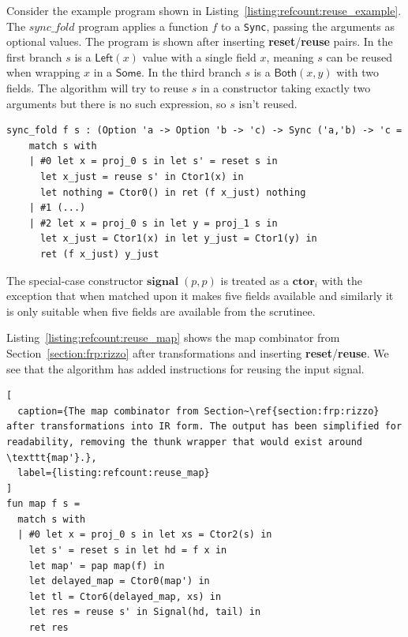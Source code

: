 Consider the example program shown in Listing~\ref{listing:refcount:reuse_example}. The $sync\_fold$ program applies a function $f$ to a \texttt{Sync}, passing the arguments as optional values. 
The program is shown after inserting \textbf{reset}/\textbf{reuse} pairs.
In the first branch $s$ is a $\mathsf{Left}(x)$ value with a single field $x$, meaning $s$ can be reused when wrapping $x$ in a $\mathsf{Some}$. 
In the third branch $s$ is a $\mathsf{Both}(x,y)$ with two fields. The algorithm will try to reuse $s$ in a constructor taking exactly two arguments but there is no such expression, so $s$ isn't reused.

\begin{lstlisting}[caption={A fold on sync values. The program is shown using the IR but with a type annotation for readability.}, label={listing:refcount:reuse_example}]
sync_fold f s : (Option 'a -> Option 'b -> 'c) -> Sync ('a,'b) -> 'c = 
    match s with
    | #0 let x = proj_0 s in let s' = reset s in
      let x_just = reuse s' in Ctor1(x) in 
      let nothing = Ctor0() in ret (f x_just) nothing
    | #1 (...)
    | #2 let x = proj_0 s in let y = proj_1 s in
      let x_just = Ctor1(x) in let y_just = Ctor1(y) in 
      ret (f x_just) y_just
\end{lstlisting}


The special-case constructor $\mathbf{signal} \; (p,p)$ is treated as a $\mathbf{ctor}_i$ with the exception that when matched upon it makes five fields available and similarly it is only suitable when five fields are available from the scrutinee.

Listing~\ref{listing:refcount:reuse_map} shows the map combinator from Section~\ref{section:frp:rizzo} after transformations and inserting \textbf{reset}/\textbf{reuse}. 
We see that the algorithm has added instructions for reusing the input signal.


\begin{lstlisting}[
  caption={The map combinator from Section~\ref{section:frp:rizzo} after transformations into IR form. The output has been simplified for readability, removing the thunk wrapper that would exist around \texttt{map'}.},
  label={listing:refcount:reuse_map}
]
fun map f s =
  match s with
  | #0 let x = proj_0 s in let xs = Ctor2(s) in
    let s' = reset s in let hd = f x in 
    let map' = pap map(f) in 
    let delayed_map = Ctor0(map') in
    let tl = Ctor6(delayed_map, xs) in
    let res = reuse s' in Signal(hd, tail) in
    ret res
\end{lstlisting}
 
